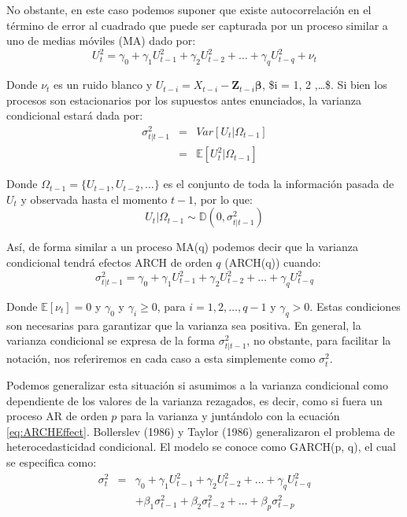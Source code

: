 \documentclass[
]{book}
\begin{document}
No obstante, en este caso podemos suponer que existe autocorrelación en el término de error al cuadrado que puede ser capturada por un proceso similar a uno de medias móviles (MA) dado por:
\begin{equation}
    U_t^2 = \gamma_0 + \gamma_1 U_{t-1}^2 + \gamma_2 U_{t-2}^2 + \ldots + \gamma_q U_{t-q}^2 + \nu_t
\end{equation}

Donde \(\nu_t\) es un ruido blanco y \(U_{t-i} = X_{t-i} - \mathbf{Z}_{t-i} \boldsymbol{\beta}\), \$i = 1, 2 ,\ldots \$. Si bien los procesos son estacionarios por los supuestos antes enunciados, la varianza condicional estará dada por:
\begin{eqnarray*}
    \sigma^2_{t | t-1} & = & Var[ U_t | \Omega_{t-1} ] \\
    & = & \mathbb{E}[ U^2_t | \Omega_{t-1} ]
\end{eqnarray*}

Donde \(\Omega_{t-1} = \{U_{t-1}, U_{t-2}, \ldots \}\) es el conjunto de toda la información pasada de \(U_t\) y observada hasta el momento \(t-1\), por lo que:
\begin{equation*}
    U_t | \Omega_{t-1} \sim \mathbb{D}(0, \sigma^2_{t | t-1})
\end{equation*}

Así, de forma similar a un proceso MA(q) podemos decir que la varianza condicional tendrá efectos ARCH de orden \(q\) (ARCH(q)) cuando:
\begin{equation}
    \sigma^2_{t | t-1} = \gamma_0 + \gamma_1 U_{t-1}^2 + \gamma_2 U_{t-2}^2 + \ldots + \gamma_q U_{t-q}^2
    \label{eq:ARCHEffect}
\end{equation}

Donde \(\mathbb{E}[\nu_t] = 0\) y \(\gamma_0\) y \(\gamma_i \geq 0\), para \(i = 1, 2, \ldots, q-1\) y \(\gamma_q > 0\). Estas condiciones son necesarias para garantizar que la varianza sea positiva. En general, la varianza condicional se expresa de la forma \(\sigma^2_{t | t-1}\), no obstante, para facilitar la notación, nos referiremos en cada caso a esta simplemente como \(\sigma^2_{t}\).

Podemos generalizar esta situación si asumimos a la varianza condicional como dependiente de los valores de la varianza rezagados, es decir, como si fuera un proceso AR de orden \(p\) para la varianza y juntándolo con la ecuación \eqref{eq:ARCHEffect}. Bollerslev (1986) y Taylor (1986) generalizaron el problema de heterocedasticidad condicional. El modelo se conoce como GARCH(p, q), el cual se especifica como:
\begin{eqnarray}
    \sigma^2_t & = & \gamma_0 + \gamma_1 U_{t-1}^2 + \gamma_2 U_{t-2}^2 + \ldots + \gamma_q U_{t-q}^2 \\ \nonumber 
    & & + \beta_1 \sigma^2_{t-1} + \beta_2 \sigma^2_{t-2} + \ldots + \beta_p \sigma^2_{t-p}
    \label{eq:GARCHEffect}
\end{eqnarray}
\end{document}
